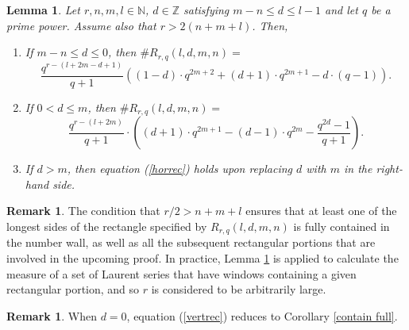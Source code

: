 \documentclass{article}
\newtheorem{lemma}[theorem]{Lemma}
\theoremstyle{definition}
\newtheorem{remark}[theorem]{Remark}
\newcommand{\N}{\mathbb{N}}
\newcommand{\Z}{\mathbb{Z}}
\numberwithin{equation}{subsection}
\begin{document}
\begin{lemma}\label{Rect}
   Let $r,n,m,l\in\N$, $d\in\Z$ satisfying $m-n\le d\le l-1$ and let $q$ be a prime power. Assume also that $r>2(n+m+l)$. Then, \begin{enumerate}
        \item If $m-n\le d\le0$, then $\#R_{r,q}(l,d,m,n)=$ \begin{equation}\frac{q^{r-(l+2m-d+1)}}{q+1}\left((1-d)\cdot q^{2m+2}+(d+1)\cdot q^{2m+1}-d\cdot(q-1)\right).\label{vertrec}\end{equation}
       \item If $0< d\le m$, then $\#R_{r,q}(l,d,m,n)=$\begin{equation}\frac{q^{r-(l+2m)}}{q+1}\cdot \left((d+1)\cdot q^{2m+1} -(d-1)\cdot q^{2m}- \frac{q^{2d}-1}{q+1}\right).\label{horrec}\end{equation}
       \item If $d>m$, then equation (\ref{horrec}) holds upon replacing $d$ with $m$ in the right-hand side.  
   \end{enumerate} 
   \noindent 
\end{lemma}

\begin{remark}\label{rect_remark}
     The condition that $r/2>n+m+l$ ensures that at least one of the longest sides of the rectangle specified by $R_{r,q}({l,d,m,n})$ is fully contained in the number wall, as well as all the subsequent rectangular portions that are involved in the upcoming proof. In practice, Lemma \ref{Rect} is applied to calculate the measure of a set of Laurent series that have windows containing a given rectangular portion, and so $r$ is considered to be arbitrarily large.  
\end{remark}
\begin{remark}
    When $d=0$, equation (\ref{vertrec}) reduces to Corollary \ref{contain full}.
\end{remark} 
\end{document}
